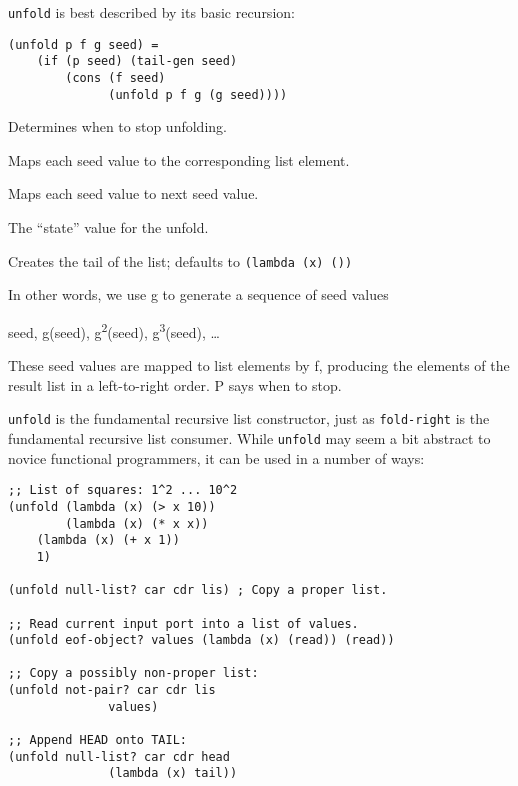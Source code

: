 \begin{entry}{%
  }

 \texttt{unfold} is best described by its basic recursion:

\begin{verbatim}
(unfold p f g seed) = 
    (if (p seed) (tail-gen seed)
        (cons (f seed)
              (unfold p f g (g seed))))
\end{verbatim}

\begin{description}
  \tightlist
\item[ p ] Determines when to stop unfolding.
\item[ f ] Maps each seed value to the corresponding list element.
\item[ g ] Maps each seed value to next seed value.
\item[ seed ] The ``state'' value for the unfold.
\item[ tail-gen ] Creates the tail of the list; defaults to
  \texttt{(lambda\ (x)\ \textquotesingle{}())}
\end{description}

In other words, we use g to generate a sequence of seed values

seed, g(seed), g\textsuperscript{2}(seed), g\textsuperscript{3}(seed),
\ldots{}

These seed values are mapped to list elements by f, producing the
elements of the result list in a left-to-right order. P says when to
stop.

\texttt{unfold} is the fundamental recursive list constructor, just as
\texttt{fold-right} is the fundamental recursive list consumer. While
\texttt{unfold} may seem a bit abstract to novice functional
programmers, it can be used in a number of ways:

\begin{verbatim}
;; List of squares: 1^2 ... 10^2
(unfold (lambda (x) (> x 10))
        (lambda (x) (* x x))
    (lambda (x) (+ x 1))
    1)
        
(unfold null-list? car cdr lis) ; Copy a proper list.

;; Read current input port into a list of values.
(unfold eof-object? values (lambda (x) (read)) (read))

;; Copy a possibly non-proper list:
(unfold not-pair? car cdr lis 
              values)

;; Append HEAD onto TAIL:
(unfold null-list? car cdr head 
              (lambda (x) tail))
\end{verbatim}


\end{entry}
